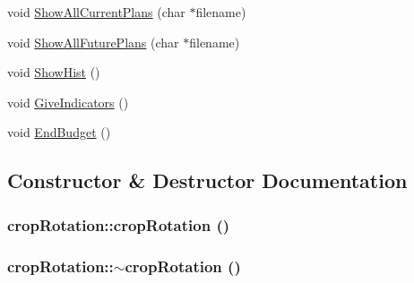 \begin{DoxyCompactItemize}
\item 
void \hyperlink{classcrop_rotation_a53e0e2576f3abb04384ac5cb76e86653}{ShowAllCurrentPlans} (char $\ast$filename)
\item 
void \hyperlink{classcrop_rotation_ab81d66407197d16d96b35c5150e1198f}{ShowAllFuturePlans} (char $\ast$filename)
\item 
void \hyperlink{classcrop_rotation_a646c61e2c4d60b8883e8a18dc4ad51ca}{ShowHist} ()
\item 
void \hyperlink{classcrop_rotation_a487968cb6691bf0a24568bcb14078a50}{GiveIndicators} ()
\item 
void \hyperlink{classcrop_rotation_a8e10518d55c693afca303214eb909f8a}{EndBudget} ()
\end{DoxyCompactItemize}


\subsection{Constructor \& Destructor Documentation}
\hypertarget{classcrop_rotation_ae7b86becd93c7b2683959a9761544e26}{
\subsubsection[{cropRotation}]{\setlength{\rightskip}{0pt plus 5cm}cropRotation::cropRotation ()}}
\label{classcrop_rotation_ae7b86becd93c7b2683959a9761544e26}
\hypertarget{classcrop_rotation_a10e666b20669411f733598b1cb945a9a}{
\subsubsection[{$\sim$cropRotation}]{\setlength{\rightskip}{0pt plus 5cm}cropRotation::$\sim$cropRotation ()}}
\label{classcrop_rotation_a10e666b20669411f733598b1cb945a9a}


